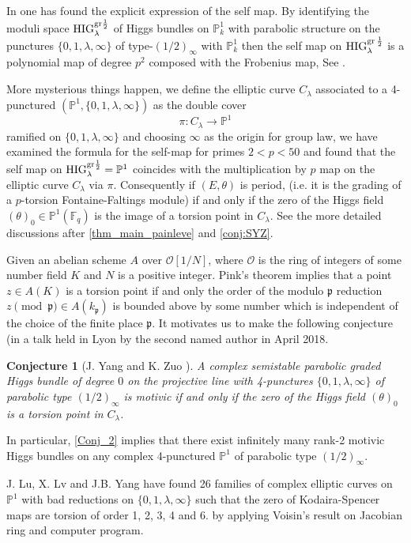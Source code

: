 \documentclass[12pt,twoside]{book}
\theoremstyle{plain}
\newtheorem{conjecture}[conjecture]{Conjecture}
\theoremstyle{definition}
\theoremstyle{remark}
\newcommand{\frakp}{{\mathfrak p}}
\newcommand{\mO}{{\mathcal O}}
\numberwithin{equation}{section}
\def\High{{\mathrm{HIG}^{{\rm gr}\,{1\over 2}}_{\lambda}}}
\begin{document}
In \cite{SYZ22}  one has found the explicit expression of the self map. By  identifying the moduli space  $\text{HIG}^{\text{gr} {1\over 2}}_\lambda $ of Higgs bundles on $\mathbb P^1_k$ with parabolic structure on the punctures $\{0,1,\lambda, \infty\}$ of type-$(1/2)_\infty$ with $\mathbb P^1_k$ then the self map on $\High$ is a polynomial map of degree $p^2$ composed with the Frobenius map, See \cite[appendix A]{SYZ22}.

More mysterious things happen, we define the elliptic curve $C_\lambda$ associated to a 4-punctured $(\mathbb P^1,\{0,1,\lambda, \infty\})$ as the double cover
$$ \pi: C_\lambda\to \mathbb P^1$$ ramified on $\{0,1,\lambda, \infty\}$
and choosing $\infty$ as the origin for group law, we have examined the formula for the self-map for primes $2< p< 50$ and found that the self map on  $\text{HIG}^{\text{gr} {1\over 2}}_\lambda =\mathbb P^1$  coincides with the multiplication by $p$ map on the elliptic curve $C_\lambda$ via $\pi$.  Consequently  if $(E,\theta)$ is period, (i.e. it is the grading of a $p$-torsion Fontaine-Faltings module) if and only if the zero of the Higgs field $(\theta)_0\in \mathbb P^1(\mathbb F_q)$ is the image of a torsion point in $C_\lambda$. See the more detailed discussions after \autoref{thm_main_painleve} and \autoref{conj:SYZ}.

Given an abelian scheme $A$ over $\mathcal O[1/N]$, where $\mO$ is the ring of integers of some number field $K$ and $N$ is a positive integer. Pink's theorem \cite{Pin04} implies that a point $z\in A(K)$ is a torsion point if and only the order of the modulo $\frakp$ reduction $z\pmod{\frakp} \in A(k_{\frakp})$ is bounded above by some number which is independent of the choice of the finite place $\frakp$. It motivates us to make the following conjecture (in a talk held in Lyon by the second named author in April 2018.
\begin{conjecture} [J. Yang and K. Zuo \cite{Lyon-Talk}] \label{Conj_2}
A complex semistable parabolic graded Higgs bundle  of degree $0$ on the projective line with 4-punctures $\{0,1,\lambda,\infty\}$
of parabolic type $(1/2)_\infty$ is motivic if and only if the zero of the Higgs field $(\theta)_0$ is a torsion point in $C_\lambda$.
\end{conjecture}
In particular, \autoref{Conj_2} implies that there exist infinitely many rank-2 motivic Higgs bundles on any complex 4-punctured $\mathbb P^1$ of parabolic type $(1/2)_\infty$.

J. Lu, X. Lv and J.B. Yang have found 26 families of complex elliptic curves on $\mathbb P^1$ with bad reductions on $\{0,1, \lambda, \infty\}$ such that the zero of Kodaira-Spencer maps are torsion of order 1, 2, 3, 4 and 6. \cite{LLY} by applying Voisin's result on Jacobian ring and computer program.
\end{document}
